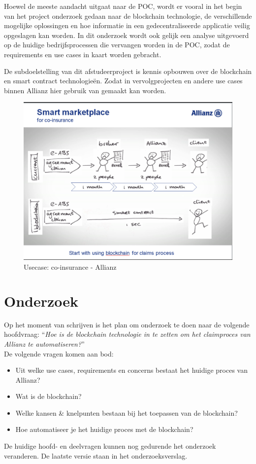 Hoewel de meeste aandacht uitgaat naar de POC, wordt er vooral in het begin van het project onderzoek gedaan naar de blockchain technologie, de verschillende mogelijke oplossingen en hoe informatie in een gedecentraliseerde applicatie veilig opgeslagen kan worden. In dit onderzoek wordt ook gelijk een analyse uitgevoerd op de huidige bedrijfsprocessen die vervangen worden in de POC, zodat de requirements en use cases in kaart worden gebracht.\par

De subdoelstelling van dit afstudeerproject is kennis opbouwen over de blockchain en smart contract technologieën. Zodat in vervolgprojecten en andere use cases binnen Allianz hier gebruik van gemaakt kan worden.

\begin{figure}[h!]
    \begin{center}
        \includegraphics[scale=0.4]{images/allianz-blockchain}
        \caption{Usecase: co-insurance - Allianz}
        \label{fig:allianz-blockchain}
    \end{center}
\end{figure}

\newpage
\section{Onderzoek}
Op het moment van schrijven is het plan om onderzoek te doen naar de volgende hoofdvraag: ``\textit{Hoe is de blockchain technologie in te zetten om het claimproces van Allianz te automatiseren?}''\\
De volgende vragen komen aan bod:
\begin{itemize}
  \item Uit welke use cases, requirements en concerns bestaat het huidige proces van Allianz?
  \item Wat is de blockchain?
  \item Welke kansen \& knelpunten bestaan bij het toepassen van de blockchain?
  \item Hoe automatiseer je het huidige proces met de blockchain?
\end{itemize}
De huidige hoofd- en deelvragen kunnen nog gedurende het onderzoek veranderen. De laatste versie staan in het onderzoeksverslag.